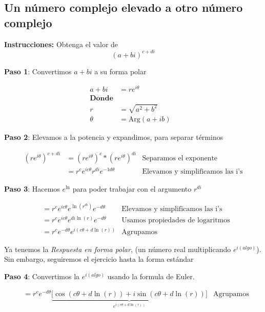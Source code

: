 \subsection{Un número complejo elevado a otro número complejo}

\textbf{Instrucciones: } Obtenga el valor de \[ (a + bi)^{c + di} \]

\textbf{Paso 1}: Convertimos $a + bi$ a su forma polar

\begin{align}
    a + bi &= re^{i\theta} & \nonumber \\
    \textbf{Donde} & \nonumber \\
    r &= \sqrt{a^2 + b^2} \label{eq:CompPowComp_r} \\
    \theta &= \text{Arg}(a + ib) \label{eq:CompPowComp_theta}
\end{align}

\textbf{Paso 2}: Elevamos a la potencia y expandimos, para separar términos

\begin{align*}
    (re^{i\theta})^{c + di} &=
        (re^{i\theta})^c * (re^{i\theta})^{di} &
        \text{Separamos el exponente} \\
    &= r^c e^{ic\theta} r^{di} e^{-1d\theta} & \text{Elevamos y simplificamos las i's}
\end{align*}

\textbf{Paso 3}: Hacemos $e^{\ln}$ para poder trabajar con el argumento $r^{di}$

\begin{align*}
    &= r^c e^{ic\theta} e^{\ln(r^{di})} e^{-d\theta} & \text{Elevamos y simplificamos las i's} \\
    &= r^c e^{ic\theta} e^{di\ln(r)} e^{-d\theta} & \text{Usamos propiedades de logaritmos} \\
    &= r^c e^{-d\theta} e^{i(c\theta + d\ln(r))} & \text{Agrupamos}
\end{align*}

Ya tenemos la \textit{Respuesta en forma polar}, (un número real multiplicando $e^{i(algo)}$). Sin embargo, seguiremos el ejercicio hasta la forma estándar

\textbf{Paso 4}: Convertimos la $e^{i(algo)}$ usando la formula de Euler.

\begin{align}
    &= r^c e^{-d\theta} \underbrace{
            \bigl[ \cos(c\theta + d\ln(r)) + i\sin(c\theta + d\ln(r)) \bigr]
        }_{e^{i(c\theta + d\ln(r))}}  & \text{Agrupamos}
        \label{eq:CompPowComp_small}
\end{align}


